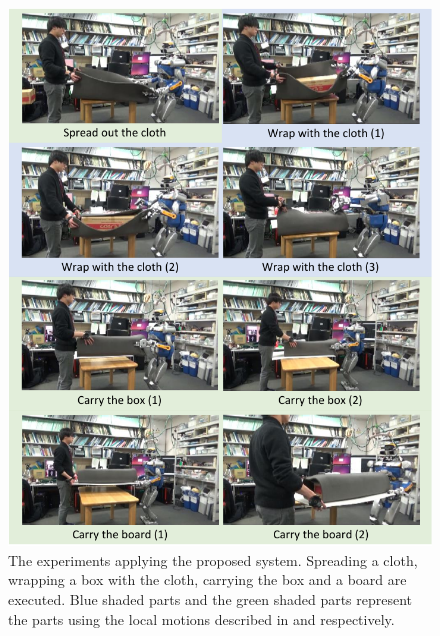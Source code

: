 
\begin{figure}[htbp]
  \begin{center}
    \includegraphics[width=1.00\columnwidth]{figs/demo_all_short}
    \caption{The experiments applying the proposed system. Spreading a cloth, wrapping a box with the cloth, carrying the box and a board are executed. Blue shaded parts and the green shaded parts represent the parts using the local motions described in  and  respectively.}
    \label{figure:demo_all}
  \end{center}
\end{figure}
